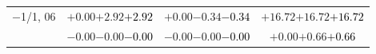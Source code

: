 \documentclass[compress]{beamer}
\begin{document}
\begin{frame}
\begin{tabular}{r | c | c | c}
$-$1/1, 06 & $+0.00$\hspace{0.1 cm}$+2.92$\hspace{0.1 cm}\textcolor{black}{$+2.92$} & $+0.00$\hspace{0.1 cm}$-0.34$\hspace{0.1 cm}\textcolor{black}{$-0.34$} & $+16.72$\hspace{0.1 cm}$+16.72$\hspace{0.1 cm}\textcolor{black}{$+16.72$} \\
           & $-0.00$\hspace{0.1 cm}$-0.00$\hspace{0.1 cm}\textcolor{black}{$-0.00$} & $-0.00$\hspace{0.1 cm}$-0.00$\hspace{0.1 cm}\textcolor{black}{$-0.00$} & $+0.00$\hspace{0.1 cm}$+0.66$\hspace{0.1 cm}\textcolor{black}{$+0.66$} \\
\end{tabular}
\end{frame}
\end{document}
